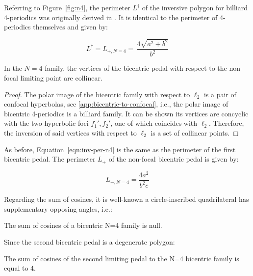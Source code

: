 Referring to Figure~\ref{fig:n4}, the perimeter $L^\dagger$ of the inversive polygon for billiard 4-periodics was originally derived in  \cite[Prop. 18]{garcia2020-self-intersected}. It is identical to the perimeter of 4-periodics themselves and given by:

\begin{equation}
    L^\dagger= L_{+,N=4}= \,{\frac {4\sqrt {{a}^{2}+{b}^{2}}}{{b}^{2}}}
\label{eqn:inv-per-n4} 
\end{equation}

\begin{proposition}\label{prop:bicentricpedalN4}
In the $N=4$ family, the vertices of the bicentric pedal with respect to the non-focal limiting point are collinear.
\end{proposition}

\begin{proof}
The polar image of the bicentric family with respect to $\ell_2$ is a pair of confocal hyperbolas, see \cref{app:bicentric-to-confocal}, i.e., the polar image of bicentric 4-periodics is a billiard family. It can be shown its vertices are concyclic with the two hyperbolic foci $f_1',f_2'$, one of which coincides with $\ell_2$. Therefore, the inversion of said vertices with respect to $\ell_2$ is a set of collinear points.
\end{proof}

As before, Equation~\ref{eqn:inv-per-n4} is the same as the perimeter of the first bicentric pedal. The perimeter $L_+$ of the non-focal bicentric pedal is given by:

\[ L_{-,N=4} = \frac{4a^2}{b^2 c} \]

Regarding the sum of cosines, it is well-known a circle-inscribed quadrilateral has supplementary opposing angles, i.e.:

\begin{observation}
The sum of cosines of a bicentric N=4 family is null.
\end{observation}

Since the second bicentric pedal is a degenerate polygon:

\begin{observation}
The sum of cosines of the second limiting pedal to the N=4 bicentric family is equal to 4.
\end{observation}
